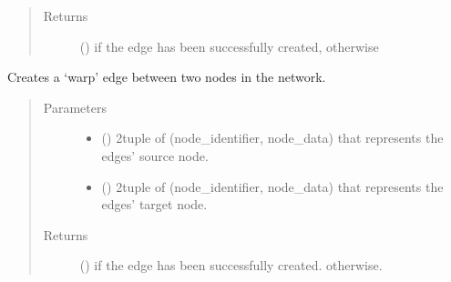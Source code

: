 \documentclass[letterpaper,10pt,english]{sphinxmanual}
\begin{document}
\begin{fulllineitems}
\begin{fulllineitems}
\begin{quote}
\begin{description}
\item[{Returns}] \leavevmode
{} () \textendash{}  if the edge has been successfully created,
 otherwise

\end{description}\end{quote}

\end{fulllineitems}


\begin{fulllineitems}
\label{\detokenize{cockatoo:cockatoo.KnitNetworkBase.create_warp_edge}}
Creates a ‘warp’ edge between two nodes in the network.
\begin{quote}\begin{description}
\item[{Parameters}] \leavevmode\begin{itemize}
\item {} 
 () \textendash{} 2\sphinxhyphen{}tuple of (node\_identifier, node\_data) that represents the edges’
source node.

\item {} 
 () \textendash{} 2\sphinxhyphen{}tuple of (node\_identifier, node\_data) that represents the edges’
target node.

\end{itemize}

\item[{Returns}] \leavevmode
{} () \textendash{}  if the edge has been successfully created.
 otherwise.

\end{description}\end{quote}

\end{fulllineitems}


\end{fulllineitems}
\end{document}
